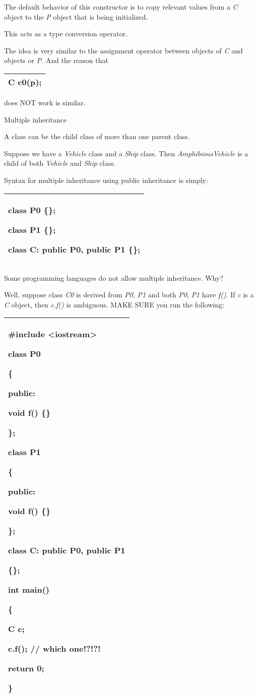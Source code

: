 \documentclass[
]{article}
\begin{document}
The default behavior of this constructor is to copy relevant values from
a \emph{C} object to the \emph{P} object that is being initialized.

This acts as a type conversion operator.

The idea is very similar to the assignment operator between objects of
\emph{C} and objects or \emph{P}. And the reason that

\begin{longtable}[]{@{}l@{}}
\toprule
\endhead
C c0(p);\tabularnewline
\bottomrule
\end{longtable}

does NOT work is similar.

Multiple inheritance

A class can be the child class of more than one parent class.

Suppose we have a \emph{Vehicle} class and a \emph{Ship} class. Then
\emph{AmphibiousVehicle} is a child of both \emph{Vehicle} and
\emph{Ship} class.

Syntax for multiple inheritance using public inheritance is simply:

\begin{longtable}[]{@{}l@{}}
\toprule
\endhead
\begin{minipage}[t]{0.97\columnwidth}\raggedright
class P0 \{\};

class P1 \{\};

class C: public P0, public P1 \{\};\strut
\end{minipage}\tabularnewline
\bottomrule
\end{longtable}

Some programming languages do not allow multiple inheritance. Why?

Well, suppose class \emph{C0} is derived from \emph{P0}, \emph{P1} and
both \emph{P0}, \emph{P1} have \emph{f()}. If \emph{c} is a \emph{C}
object, then \emph{c.f()} is ambiguous. MAKE SURE you run the following:

\begin{longtable}[]{@{}l@{}}
\toprule
\endhead
\begin{minipage}[t]{0.97\columnwidth}\raggedright
\#include \textless iostream\textgreater{}

class P0

\{

public:

void f() \{\}

\};

class P1

\{

public:

void f() \{\}

\};

class C: public P0, public P1

\{\};

int main()

\{

C c;

c.f(); // which one!?!?!

return 0;

\}\strut
\end{minipage}\tabularnewline
\bottomrule
\end{longtable}
\end{document}
